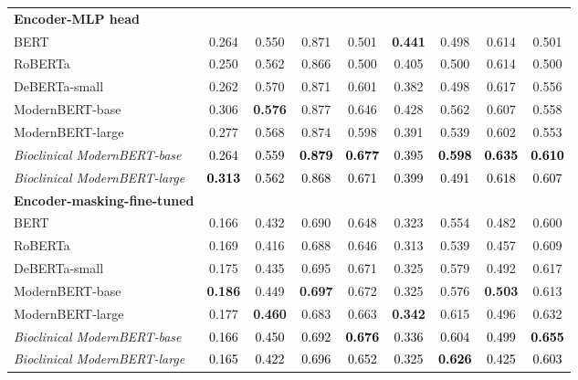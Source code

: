 \begin{table}[!htbp]
{\begin{tabular}{lcccccccc}
\midrule
\textbf{Encoder-MLP head} &&&&&&&&\\
BERT & 0.264 & 0.550 & 0.871 & 0.501 & \textbf{0.441} & 0.498 & 0.614 & 0.501 \\
RoBERTa & 0.250 & 0.562 & 0.866 & 0.500 & 0.405 & 0.500 & 0.614 & 0.500 \\
DeBERTa-small & 0.262 & 0.570 & 0.871 & 0.601 & 0.382 & 0.498 & 0.617 & 0.556 \\
ModernBERT-base & 0.306 & \textbf{0.576} & 0.877 & 0.646 & 0.428 & 0.562 & 0.607 & 0.558 \\
ModernBERT-large & 0.277 & 0.568 & 0.874 & 0.598 & 0.391 & 0.539 & 0.602 & 0.553 \\
\textit{Bioclinical ModernBERT-base} & \textcolor{black}{0.264} & \textcolor{black}{0.559} & \textcolor{black}{\textbf{0.879}} & \textcolor{black}{\textbf{0.677}} & \textcolor{black}{0.395} & \textcolor{black}{\textbf{0.598}} & \textcolor{black}{\textbf{0.635}} & \textcolor{black}{\textbf{0.610}} \\
\textit{Bioclinical ModernBERT-large} & \textcolor{black}{\textbf{0.313}} & \textcolor{black}{0.562} & \textcolor{black}{0.868} & \textcolor{black}{0.671} & \textcolor{black}{0.399} & \textcolor{black}{0.491} & \textcolor{black}{0.618} & \textcolor{black}{0.607} \\
\midrule
\textbf{Encoder-masking-fine-tuned} &&&&&&&&\\
BERT & 0.166 & 0.432 & 0.690 & 0.648 & 0.323 & 0.554 & 0.482 & 0.600 \\
RoBERTa & 0.169 & 0.416 & 0.688 & 0.646 & 0.313 & 0.539 & 0.457 & 0.609 \\
DeBERTa-small & 0.175 & 0.435 & 0.695 & 0.671 & 0.325 & 0.579 & 0.492 & 0.617 \\
ModernBERT-base & \textbf{0.186} & 0.449 & \textbf{0.697} & 0.672 & 0.325 & 0.576 & \textbf{0.503} & 0.613 \\
ModernBERT-large & 0.177 & \textbf{0.460} & 0.683 & 0.663 & \textbf{0.342} & 0.615 & 0.496 & 0.632 \\
\textit{Bioclinical ModernBERT-base} & \textcolor{black}{0.166} & \textcolor{black}{0.450} & \textcolor{black}{0.692} & \textcolor{black}{\textbf{0.676}} & \textcolor{black}{0.336} & \textcolor{black}{0.604} & \textcolor{black}{0.499} & \textcolor{black}{\textbf{0.655}} \\
\textit{Bioclinical ModernBERT-large} & \textcolor{black}{0.165} & \textcolor{black}{0.422} & \textcolor{black}{0.696} & \textcolor{black}{0.652} & \textcolor{black}{0.325} & \textcolor{black}{\textbf{0.626}} & \textcolor{black}{0.425} & \textcolor{black}{0.603} \\

\end{tabular}}
\end{table}
